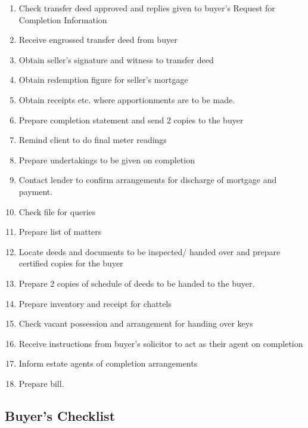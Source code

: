 \documentclass[
]{article}
\providecommand{\tightlist}{%
  \setlength{\itemsep}{0pt}\setlength{\parskip}{0pt}}
\begin{document}
\begin{enumerate}
\tightlist
\item
  Check transfer deed approved and replies given to buyer's Request for
  Completion Information
\item
  Receive engrossed transfer deed from buyer
\item
  Obtain seller's signature and witness to transfer deed
\item
  Obtain redemption figure for seller's mortgage
\item
  Obtain receipts etc. where apportionments are to be made.
\item
  Prepare completion statement and send 2 copies to the buyer
\item
  Remind client to do final meter readings
\item
  Prepare undertakings to be given on completion
\item
  Contact lender to confirm arrangements for discharge of mortgage and
  payment.
\item
  Check file for queries
\item
  Prepare list of matters
\item
  Locate deeds and documents to be inspected/ handed over and prepare
  certified copies for the buyer
\item
  Prepare 2 copies of schedule of deeds to be handed to the buyer.
\item
  Prepare inventory and receipt for chattels
\item
  Check vacant possession and arrangement for handing over keys
\item
  Receive instructions from buyer's solicitor to act as their agent on
  completion
\item
  Inform estate agents of completion arrangements
\item
  Prepare bill.
\end{enumerate}

\hypertarget{buyers-checklist}{%
\subsection{Buyer's Checklist}\label{buyers-checklist}}
\end{document}
